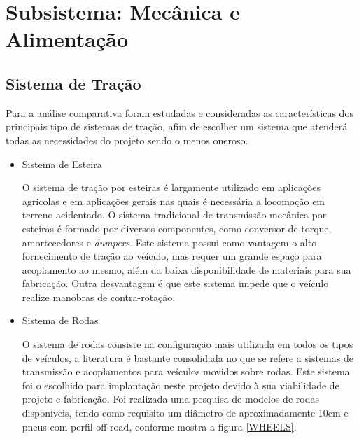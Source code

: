 \section{Subsistema: Mecânica e Alimentação}

  \subsection{Sistema de Tração}

  Para a análise comparativa foram estudadas e consideradas as características dos principais tipo de sistemas de tração,
  afim de escolher um sistema que atenderá todas as necessidades do projeto sendo o menos oneroso.

  \begin{itemize}
    \item Sistema de Esteira

    O sistema de tração por esteiras é largamente utilizado em aplicações agrícolas e em aplicações gerais nas quais é necessária
    a locomoção em terreno acidentado. O sistema tradicional de transmissão mecânica por esteiras é formado por diversos componentes,
    como conversor de torque, amortecedores e \textit{dumpers}.
    Este sistema possui como vantagem o alto fornecimento de tração ao veículo, mas requer um grande espaço para acoplamento ao mesmo,
    além da baixa disponibilidade de materiais para sua fabricação. Outra desvantagem é que este sistema impede que o veículo realize
    manobras de contra-rotação.

    \item Sistema de Rodas

    O sistema de rodas consiste na configuração mais utilizada em todos os tipos de veículos, a literatura é bastante consolidada
    no que se refere a sistemas de transmissão e acoplamentos para veículos movidos sobre rodas. Este sistema foi o escolhido para
    implantação neste projeto devido à sua viabilidade de projeto e fabricação.
    Foi realizada uma pesquisa de modelos de rodas disponíveis, tendo como requisito um diâmetro de aproximadamente 10cm e pneus com
    perfil off-road, conforme mostra a figura \ref{WHEELS}.


\end{itemize}
